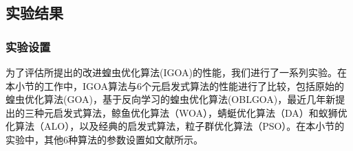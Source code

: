 \subsection{实验结果}
\subsubsection{实验设置}

为了评估所提出的改进蝗虫优化算法(IGOA)的性能，我们进行了一系列实验。在本小节的工作中，IGOA算法与6个元启发式算法的性能进行了比较，包括原始的蝗虫优化算法(GOA)，基于反向学习的蝗虫优化算法(OBLGOA)，最近几年新提出的三种元启发式算法，鲸鱼优化算法（WOA），蜻蜓优化算法（DA）和蚁狮优化算法（ALO），以及经典的启发式算法，粒子群优化算法（PSO）。在本小节的实验中，其他6种算法的参数设置如文献\cite{saremi2017grasshopper,ewees2018improved,mirjalili2016whale,mirjalili2016dragonfly,mirjalili2015ant,kennedy1995particle}所示。

